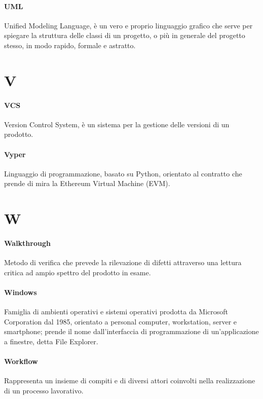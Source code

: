 \documentclass[]{article}
\begin{document}
	\paragraph*{UML}
	Unified Modeling Language, è un vero e proprio linguaggio grafico che serve per spiegare la struttura delle classi di un progetto, o più in generale del progetto stesso, in modo rapido, formale e astratto.
		
	\newpage
	
	\section*{V}
	
	\paragraph*{VCS}
	Version Control System, è un sistema per la gestione delle versioni di un prodotto.
	
	\paragraph*{Vyper}
	Linguaggio di programmazione, basato su Python, orientato al contratto che prende di mira la Ethereum Virtual Machine (EVM).
	
	\newpage
	
	\section*{W}
	
	\paragraph*{Walkthrough}
	Metodo di verifica che prevede la rilevazione di difetti attraverso una lettura critica ad ampio spettro del prodotto in esame.
	
	\paragraph*{Windows}
	Famiglia di ambienti operativi e sistemi operativi prodotta da Microsoft Corporation dal 1985, orientato a personal computer, workstation, server e smartphone; prende il nome dall'interfaccia di programmazione di un'applicazione a finestre, detta File Explorer.
	
	\paragraph*{Workflow}
	Rappresenta un insieme di compiti e di diversi attori coinvolti nella realizzazione di un processo lavorativo.
	
\end{document}
